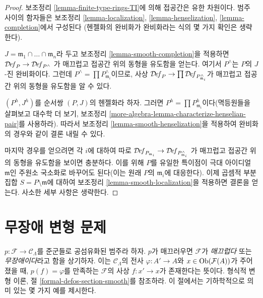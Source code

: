 \begin{proof}
보조정리 \ref{lemma-finite-type-rings-TI}에 의해 접공간은 유한 차원이다.
범주 사이의 함자들은 보조정리 \ref{lemma-localization},
\ref{lemma-henselization}, \ref{lemma-completion}에서 구성된다
(헨젤화의 완비화가 완비화라는 식의 몇 가지 확인은 생략한다).

\medskip\noindent
$J = \mathfrak m_1 \cap \ldots \cap \mathfrak m_n$라 두고 보조정리
\ref{lemma-smooth-completion}을 적용하면
$\mathcal{D}\!\mathit{ef}_P \to \mathcal{D}\!\mathit{ef}_{P^\wedge}$
가 매끄럽고 접공간 위의 동형을 유도함을 얻는다. 여기서 $P^\wedge$는
$P$의 $J$-진 완비화이다. 그런데
$P^\wedge = \prod P_{\mathfrak m_i}^\wedge$이므로, 사상
$\mathcal{D}\!\mathit{ef}_P \to
\prod \mathcal{D}\!\mathit{ef}_{P_{\mathfrak m_i}^\wedge}$가 매끄럽고
접공간 위의 동형을 유도함을 알 수 있다.

\medskip\noindent
$(P^h, J^h)$를 순서쌍 $(P, J)$의 헨젤화라 하자. 그러면
$P^h = \prod P_{\mathfrak m_i}^h$이다(멱등원들을 살펴보고 대수학 더 보기,
보조정리 \ref{more-algebra-lemma-characterize-henselian-pair}를 사용하라).
따라서 보조정리 \ref{lemma-smooth-henselization}을 적용하여 완비화의 경우와
같이 결론 내릴 수 있다.

\medskip\noindent
마지막 경우를 얻으려면 각 $i$에 대하여 따로
$\mathcal{D}\!\mathit{ef}_{P_{\mathfrak m_i}} \to
\mathcal{D}\!\mathit{ef}_{P_{\mathfrak m_i}^\wedge}$
가 매끄럽고 접공간 위의 동형을 유도함을 보이면 충분하다.%
이를 위해 $P$를 유일한 특이점이 극대 아이디얼 $\mathfrak m$인
주원소 국소화로 바꾸어도 된다(이는 원래 $P$의 $\mathfrak m_i$에
대응한다). 이제 곱셈적 부분집합 $S = P \setminus \mathfrak m$에 대하여
보조정리 \ref{lemma-smooth-localization}을 적용하면 결론을 얻는다.
사소한 세부 사항은 생략한다.
\end{proof}






\section{무장애 변형 문제}
\label{section-unobstructed}

\noindent
$p : \mathcal{F} \to \mathcal{C}_\Lambda$를 준군들로 공섬유화된 범주라
하자. $p$가 매끄러우면 $\mathcal{F}$가 {\it 매끄럽다} 또는
{\it 무장애이다}라고 함을 상기하자. 이는 $\mathcal{C}_\Lambda$의 전사
$\varphi : A' \to A$와 $x \in \mathop{\mathrm{Ob}}\nolimits(\mathcal{F}(A))$가 주어졌을 때,
$p(f) = \varphi$를 만족하는 $\mathcal{F}$의 사상 $f : x' \to x$가
존재한다는 뜻이다. 형식적 변형 이론, 절
\ref{formal-defos-section-smooth}를 참조하라. 이 절에서는 기하학적으로
의미 있는 몇 가지 예를 제시한다.

